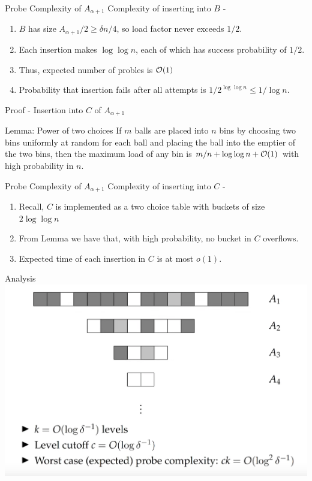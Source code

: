 \documentclass{beamer}
\begin{document}
\begin{frame}{Probe Complexity of $A_{\alpha + 1}$}
	Complexity of inserting into $B$ - 
	\begin{enumerate}
		\item $B$ has size $A_{\alpha + 1}/2 \ge \delta n/4$, so load factor never exceeds $1/2$. 
		\item Each insertion makes $\log{\log{n}}$, each of which has success probability of $1/2$. 
		\item Thus, expected number of probles is ${\cal O}(1)$
		\item Probability that insertion fails after all attempts is $1/2^{\log{\log{n}}} \le 1/ \log{n}$.
	\end{enumerate}
\end{frame}

\begin{frame}{Proof - Insertion into $C$ of $A_{\alpha+1}$}
	\begin{block}{Lemma: Power of two choices}
		If $m$ balls are placed into $n$ bins by choosing two bins uniformly at random for each ball and placing the ball into the emptier of the two bins, then the maximum load of any bin is $m/n + \log{\log{n}} + {\cal O}(1)$ with high probability in $n$.
	\end{block}
\end{frame}

\begin{frame}{Probe Complexity of $A_{\alpha + 1}$}
	Complexity of inserting into $C$ - 
	\begin{enumerate}
		\item Recall, $C$ is implemented as a two choice table with buckets of size $2\log{\log{n}}$
		\item From Lemma we have that, with high probability, no bucket in $C$ overflows. 
		\item Expected time of each insertion in $C$ is at most $o(1)$.
	\end{enumerate}
\end{frame}

\begin{frame}{Analysis}
	\includegraphics[scale=0.3]{analysis}
\end{frame}
\end{document}
